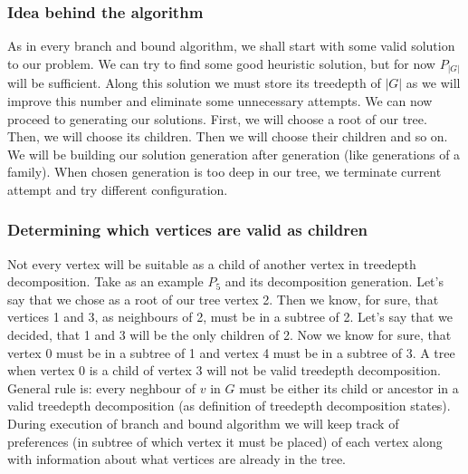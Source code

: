 \subsubsection{Idea behind the algorithm}
As in every branch and bound algorithm, we shall start with some valid solution to our problem. We can try to find some good heuristic solution, but for now $P_{\left|G\right|}$ will be sufficient. Along this solution we must store its treedepth of $\left|G\right|$ as we will improve this number and eliminate some unnecessary attempts. We can now proceed to generating our solutions. First, we will choose a root of our tree. Then, we will choose its children. Then we will choose their children and so on. We will be building our solution generation after generation (like generations of a family). When chosen generation is too deep in our tree, we terminate current attempt and try different configuration.\\
\subsubsection{Determining which vertices are valid as children}
Not every vertex will be suitable as a child of another vertex in treedepth decomposition. Take as an example $P_5$ and its decomposition generation. Let's say that we chose as a root of our tree vertex 2. Then we know, for sure, that vertices 1 and 3, as neighbours of 2, must be in a subtree of 2. Let's say that we decided, that 1 and 3 will be the only children of 2. Now we know for sure, that vertex 0 must be in a subtree of 1 and vertex 4 must be in a subtree of 3. A tree when vertex 0 is a child of vertex 3 will not be valid treedepth decomposition.\\
General rule is: every neghbour of $v$ in $G$ must be either its child or ancestor in a valid treedepth decomposition (as definition of treedepth decomposition states).\\
During execution of branch and bound algorithm we will keep track of preferences (in subtree of which vertex it must be placed) of each vertex along with information about what vertices are already in the tree.
